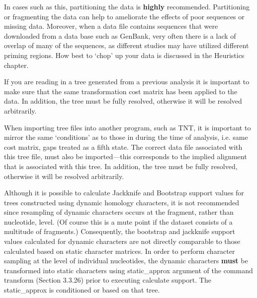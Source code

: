 {In cases such as this, partitioning the data is {\bf highly} recommended.  
Partitioning or fragmenting the data can help to ameliorate the effects of
poor sequences or missing data.  Moreover, when a data file contains
 sequences that were downloaded from a data base such as GenBank, 
 very often there is a lack of overlap of many of the sequences,
as different studies may have utilized different priming regions. 
How best to `chop' up your data is discussed in the \poy Heuristics chapter.}

{If you are reading in a tree generated from a previous analysis it is 
important to make sure that the same transformation cost matrix has 
been applied to the data. In addition, the tree must be fully resolved, 
otherwise it will be resolved arbitrarily.}

{When importing \poy tree files into another program, such as TNT, 
it is important to mirror the same `conditions' as to those in \poy
during the time of analysis, i.e. same cost matrix, gaps treated as a 
fifth state. The correct data file associated with this tree file, must also 
be imported---this corresponds to the implied alignment that is 
associated with this tree. In addition, the tree must be fully resolved, 
otherwise it will be resolved arbitrarily.}

{Although it is possible to calculate Jackknife and Bootstrap support
values for trees constructed using dynamic homology characters, it
is not recommended since resampling of dynamic characters
occurs at the fragment, rather than nucleotide, level. (Of course
this is a mute point if the dataset consists of a multitude of fragments.)
Consequently, the bootstrap and jackknife support values calculated for dynamic
characters are not directly comparable to those calculated based
on static character matrices. In order to perform character sampling
at the level of individual nucleotides, the dynamic characters {\bf
must} be transformed into static characters using \poyargument
{static\_approx} argument of the command transform (Section 3.3.26)
prior to executing calculate support.  The static\_approx is conditioned
or based on that tree.}

